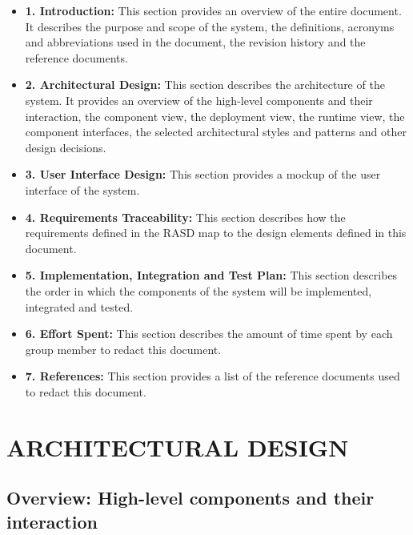 \documentclass{article}
\begin{document}
\begin{itemize}
    \item \textbf{1. Introduction:} This section provides an overview of the entire document. It describes the purpose and scope of the system, the definitions, acronyms and abbreviations used in the document, the revision history and the reference documents.
    \item \textbf{2. Architectural Design:} This section describes the architecture of the system. It provides an overview of the high-level components and their interaction, the component view, the deployment view, the runtime view, the component interfaces, the selected architectural styles and patterns and other design decisions.
    \item \textbf{3. User Interface Design:} This section provides a mockup of the user interface of the system.
    \item \textbf{4. Requirements Traceability:} This section describes how the requirements defined in the RASD map to the design elements defined in this document.
    \item \textbf{5. Implementation, Integration and Test Plan:} This section describes the order in which the components of the system will be implemented, integrated and tested.
    \item \textbf{6. Effort Spent:} This section describes the amount of time spent by each group member to redact this document.
    \item \textbf{7. References:} This section provides a list of the reference documents used to redact this document. 
\end{itemize}

\section{ARCHITECTURAL DESIGN}
\subsection{Overview: High-level components and their interaction}
\end{document}
